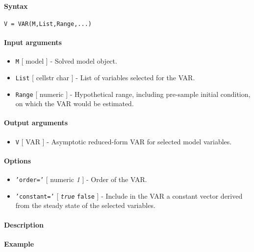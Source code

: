 


	\paragraph{Syntax}\label{syntax}

\begin{verbatim}
V = VAR(M,List,Range,...)
\end{verbatim}

\paragraph{Input arguments}\label{input-arguments}

\begin{itemize}
\item
  \texttt{M} {[} model {]} - Solved model object.
\item
  \texttt{List} {[} cellstr \textbar{} char {]} - List of variables
  selected for the VAR.
\item
  \texttt{Range} {[} numeric {]} - Hypothetical range, including
  pre-sample initial condition, on which the VAR would be estimated.
\end{itemize}

\paragraph{Output arguments}\label{output-arguments}

\begin{itemize}
\itemsep1pt\parskip0pt
\item
  \texttt{V} {[} VAR {]} - Asymptotic reduced-form VAR for selected
  model variables.
\end{itemize}

\paragraph{Options}\label{options}

\begin{itemize}
\item
  \texttt{'order='} {[} numeric \textbar{} \emph{1} {]} - Order of the
  VAR.
\item
  \texttt{'constant='} {[} \emph{\texttt{true}} \textbar{}
  \texttt{false} {]} - Include in the VAR a constant vector derived from
  the steady state of the selected variables.
\end{itemize}

\paragraph{Description}\label{description}

\paragraph{Example}\label{example}


